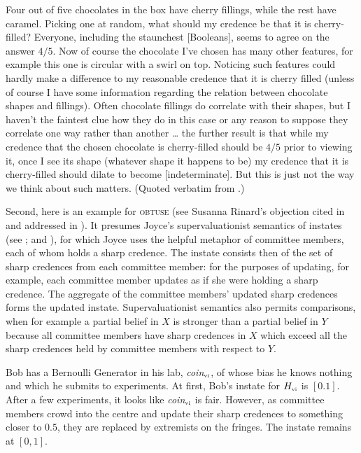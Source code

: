 \documentclass[11pt]{article}
\begin{document}
\begin{quotex}
  \label{ex:chocolates} Four out of five
  chocolates in the box have cherry fillings, while the rest have
  caramel. Picking one at random, what should my credence be that it
  is cherry-filled? Everyone, including the staunchest [Booleans],
  seems to agree on the answer $4/5$. Now of course the chocolate I've
  chosen has many other features, for example this one is circular
  with a swirl on top. Noticing such features could hardly make a
  difference to my reasonable credence that it is cherry filled
  (unless of course I have some information regarding the relation
  between chocolate shapes and fillings). Often chocolate fillings do
  correlate with their shapes, but I haven't the faintest clue how
  they do in this case or any reason to suppose they correlate one way
  rather than another {\ldots} the further result is that while my
  credence that the chosen chocolate is cherry-filled should be $4/5$
  prior to viewing it, once I see its shape (whatever shape it happens
  to be) my credence that it is cherry-filled should dilate to become
  [indeterminate]. But this is just not the way we think about such
  matters. (Quoted verbatim from .)
\end{quotex}

Second, here is an example for \textsc{obtuse} (see Susanna Rinard's
objection cited in  and addressed in
). It presumes Joyce's supervaluationist
semantics of instates (see ; and
), for which Joyce uses the helpful metaphor of
committee members, each of whom holds a sharp credence. The instate
consists then of the set of sharp credences from each committee
member: for the purposes of updating, for example, each committee
member updates as if she were holding a sharp credence. The aggregate
of the committee members' updated sharp credences forms the updated
instate. Supervaluationist semantics also permits comparisons, when
for example a partial belief in $X$ is stronger than a partial belief
in $Y$ because all committee members have sharp credences in $X$ which
exceed all the sharp credences held by committee members with respect
to $Y$.

\begin{quotex}
  \label{ex:learning} Bob has a Bernoulli
  Generator in his lab, \textit{coin}$_{\mbox{\tiny{vi}}}$, of whose
  bias he knows nothing and which he submits to experiments. At first,
  Bob's instate for $H_{\mbox{\tiny{vi}}}$ is $[0.1]$. After a few
  experiments, it looks like \textit{coin}$_{\mbox{\tiny{vi}}}$ is
  fair. However, as committee members crowd into the centre and update
  their sharp credences to something closer to $0.5$, they are
  replaced by extremists on the fringes. The instate remains at
  $[0,1]$. 
\end{quotex}
\end{document}
